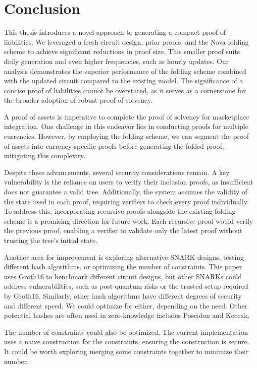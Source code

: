 
\chapter{Conclusion}

This thesis introduces a novel approach to generating a compact proof of liabilities. 
We leveraged a fresh circuit design, prior proofs, and the Nova folding scheme to achieve significant reductions in proof size. 
This smaller proof suits daily generation and even higher frequencies, such as hourly updates.
Our analysis demonstrates the superior performance of the folding scheme combined with the updated circuit compared to the existing model. 
The significance of a concise proof of liabilities cannot be overstated, as it serves as a cornerstone for the broader adoption of robust proof of solvency.

A proof of assets is imperative to complete the proof of solvency for marketplace integration. 
One challenge in this endeavor lies in conducting proofs for multiple currencies. 
However, by employing the folding scheme, we can segment the proof of assets into currency-specific proofs before generating the folded proof, mitigating this complexity.

Despite these advancements, several security considerations remain. 
A key vulnerability is the reliance on users to verify their inclusion proofs, as insufficient does not guarantee a valid tree. 
Additionally, the system assumes the validity of the state used in each proof, requiring verifiers to check every proof individually. 
To address this, incorporating recursive proofs alongside the existing folding scheme is a promising direction for future work. 
Each recursive proof would verify the previous proof, enabling a verifier to validate only the latest proof without trusting the tree's initial state. 

Another area for improvement is exploring alternative SNARK designs, testing different hash algorithms, or optimizing the number of constraints. 
This paper uses Groth16 to benchmark different circuit designs, but other SNARKs could address vulnerabilities, such as post-quantum risks or the trusted setup required by Groth16. 
Similarly, other hash algorithms have different degrees of security and different speed. We could optimize for either, depending on the need. Other potential hashes are often used in 
zero-knowledge includes Poseidon and Keccak. 

The number of constraints could also be optimized. The current implementation uses a naive construction for the constraints, ensuring the construction is secure. It could be worth exploring merging
some constraints together to minimize their number.

